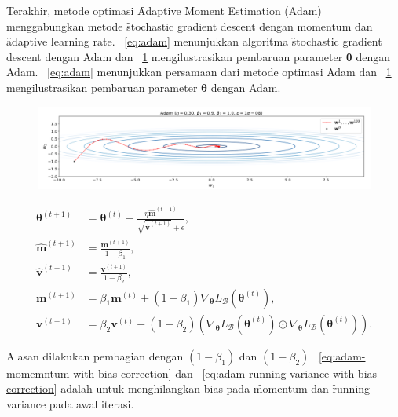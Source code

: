 Terakhir, metode optimasi \f{Adaptive Moment Estimation} (Adam) menggabungkan metode \f{stochastic gradient descent} dengan momentum dan \f{adaptive learning rate}. \equ~\ref{eq:adam} menunjukkan algoritma \f{stochastic gradient descent} dengan Adam dan \pic~\ref{fig:adam} mengilustrasikan pembaruan parameter $\bm{\theta}$ dengan Adam. \equ~\ref{eq:adam} menunjukkan persamaan dari metode optimasi Adam dan \pic~\ref{fig:adam} mengilustrasikan pembaruan parameter $\bm{\theta}$ dengan Adam.
\begin{figure}
    \centering
    \includegraphics[width=1\textwidth]{assets/pics/adam.png}
    \label{fig:adam}
\end{figure}
\begin{align}
    \label{eq:adam}
    \bm{\theta}^{(t+1)} &= \bm{\theta}^{(t)} - \frac{\eta \hat{\mathbf{m}}^{(t+1)}}{\sqrt{\hat{\mathbf{v}}^{(t+1)}} + \epsilon}, \\
    \label{eq:adam-momemntum-with-bias-correction}
    \hat{\mathbf{m}}^{(t+1)} &= \frac{\mathbf{m}^{(t+1)}}{1 - \beta_1}, \\
    \label{eq:adam-running-variance-with-bias-correction}
    \hat{\mathbf{v}}^{(t+1)} &= \frac{\mathbf{v}^{(t+1)}}{1 - \beta_2}, \\
    \mathbf{m}^{(t+1)} &= \beta_1 \mathbf{m}^{(t)} + (1 - \beta_1) \nabla_{\bm{\theta}} L_{\mathcal{B}}(\bm{\theta}^{(t)}), \\
    \mathbf{v}^{(t+1)} &= \beta_2 \mathbf{v}^{(t)} + (1 - \beta_2) \left(\nabla_{\bm{\theta}} L_{\mathcal{B}}(\bm{\theta}^{(t)})\odot \nabla_{\bm{\theta}} L_{\mathcal{B}}(\bm{\theta}^{(t)})\right).
\end{align}

Alasan dilakukan pembagian dengan $(1-\beta_1)$ dan $(1-\beta_2)$ \equ~\ref{eq:adam-momemntum-with-bias-correction} dan \equ~\ref{eq:adam-running-variance-with-bias-correction} adalah untuk menghilangkan bias pada \f{momentum} dan \f{running variance} pada awal iterasi.


